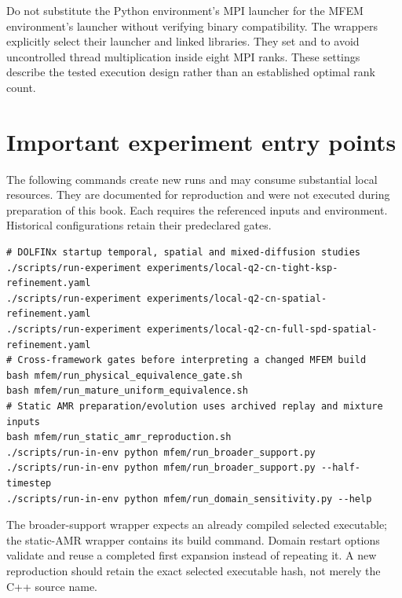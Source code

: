 Do not substitute the Python environment's MPI launcher for the MFEM environment's launcher without verifying binary compatibility. The wrappers explicitly select their launcher and linked libraries. They set  and  to avoid uncontrolled thread multiplication inside eight MPI ranks. These settings describe the tested execution design rather than an established optimal rank count.

\section{Important experiment entry points}
The following commands create new runs and may consume substantial local resources. They are documented for reproduction and were not executed during preparation of this book. Each requires the referenced inputs and environment. Historical configurations retain their predeclared gates.
\begin{lstlisting}
# DOLFINx startup temporal, spatial and mixed-diffusion studies
./scripts/run-experiment experiments/local-q2-cn-tight-ksp-refinement.yaml
./scripts/run-experiment experiments/local-q2-cn-spatial-refinement.yaml
./scripts/run-experiment experiments/local-q2-cn-full-spd-spatial-refinement.yaml
# Cross-framework gates before interpreting a changed MFEM build
bash mfem/run_physical_equivalence_gate.sh
bash mfem/run_mature_uniform_equivalence.sh
# Static AMR preparation/evolution uses archived replay and mixture inputs
bash mfem/run_static_amr_reproduction.sh
./scripts/run-in-env python mfem/run_broader_support.py
./scripts/run-in-env python mfem/run_broader_support.py --half-timestep
./scripts/run-in-env python mfem/run_domain_sensitivity.py --help
\end{lstlisting}
The broader-support wrapper expects an already compiled selected executable; the static-AMR wrapper contains its build command. Domain restart options validate and reuse a completed first expansion instead of repeating it. A new reproduction should retain the exact selected executable hash, not merely the C++ source name.

